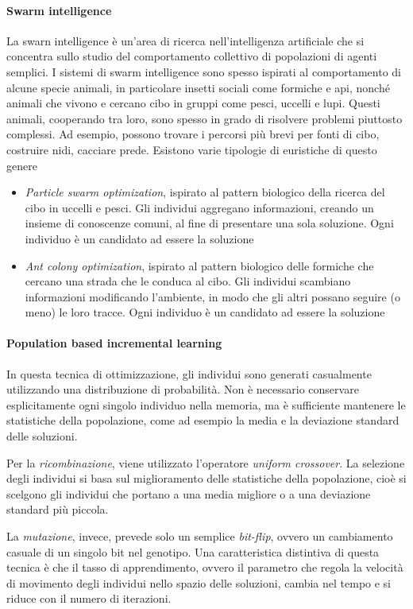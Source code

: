 \paragraph{Swarm intelligence}
La swarn intelligence è un'area di ricerca nell'intelligenza artificiale che si concentra sullo studio del comportamento collettivo di popolazioni di agenti semplici. I sistemi di swarm intelligence sono spesso ispirati al comportamento di alcune specie animali, in particolare insetti sociali come formiche e api, nonché animali che vivono e cercano cibo in gruppi come pesci, uccelli e lupi. Questi animali, cooperando tra loro, sono spesso in grado di risolvere problemi piuttosto complessi. Ad esempio, possono trovare i percorsi più brevi per fonti di cibo, costruire nidi, cacciare prede. Esistono varie tipologie di euristiche di questo genere
\begin{itemize}
    \item \textit{Particle swarm optimization}, ispirato al pattern biologico della ricerca del cibo in uccelli e pesci. Gli individui aggregano informazioni, creando un insieme di conoscenze comuni, al fine di presentare una sola soluzione. Ogni individuo è un candidato ad essere la soluzione
    \item \textit{Ant colony optimization}, ispirato al pattern biologico delle formiche che cercano una strada che le conduca al cibo. Gli individui scambiano informazioni modificando l’ambiente, in modo che gli altri possano seguire (o meno) le loro tracce. Ogni individuo è un candidato ad essere la soluzione
\end{itemize}

\paragraph{Population based incremental learning}
In questa tecnica di ottimizzazione, gli individui sono generati casualmente utilizzando una distribuzione di probabilità. Non è necessario conservare esplicitamente ogni singolo individuo nella memoria, ma è sufficiente mantenere le statistiche della popolazione, come ad esempio la media e la deviazione standard delle soluzioni.

Per la \textit{ricombinazione}, viene utilizzato l'operatore \textit{uniform crossover}. La selezione degli individui si basa sul miglioramento delle statistiche della popolazione, cioè si scelgono gli individui che portano a una media migliore o a una deviazione standard più piccola.

La \textit{mutazione}, invece, prevede solo un semplice \textit{bit-flip}, ovvero un cambiamento casuale di un singolo bit nel genotipo. Una caratteristica distintiva di questa tecnica è che il tasso di apprendimento, ovvero il parametro che regola la velocità di movimento degli individui nello spazio delle soluzioni, cambia nel tempo e si riduce con il numero di iterazioni.

